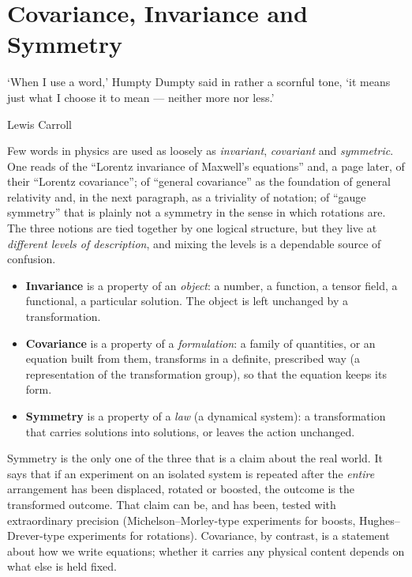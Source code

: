 \chapter{Covariance, Invariance and Symmetry}
\label{ch:cis}
\epigraph{‘When I use a word,’ Humpty Dumpty said in rather a scornful tone,
‘it means just what I choose it to mean --- neither more nor less.’} {Lewis
Carroll}

Few words in physics are used as loosely as \emph{invariant}, \emph{covariant}
and \emph{symmetric}. One reads of the ``Lorentz invariance of Maxwell's
equations'' and, a page later, of their ``Lorentz covariance''; of ``general
covariance'' as the foundation of general relativity and, in the next
paragraph, as a triviality of notation; of ``gauge symmetry'' that is plainly
not a symmetry in the sense in which rotations are. The three notions are
tied together by one logical structure, but they live at \emph{different
levels of description}, and mixing the levels is a dependable source of
confusion.

\begin{itemize}[leftmargin=1.6em,itemsep=2pt]
\item \textbf{Invariance} is a property of an \emph{object}: a number, a
  function, a tensor field, a functional, a particular solution. The object is
  left unchanged by a transformation.
\item \textbf{Covariance} is a property of a \emph{formulation}: a family of
  quantities, or an equation built from them, transforms in a definite,
  prescribed way (a representation of the transformation group), so that the
  equation keeps its form.
\item \textbf{Symmetry} is a property of a \emph{law} (a dynamical system): a
  transformation that carries solutions into solutions, or leaves the action
  unchanged.
\end{itemize}

Symmetry is the only one of the three that is a claim about the real world. It
says that if an experiment on an isolated system is repeated after the
\emph{entire} arrangement has been displaced, rotated or boosted, the outcome
is the transformed outcome. That claim can be, and has been, tested with
extraordinary precision (Michelson--Morley-type experiments for boosts,
Hughes--Drever-type experiments for rotations). Covariance, by contrast, is
a statement about how we write equations; whether it carries any physical
content depends on what else is held fixed.

